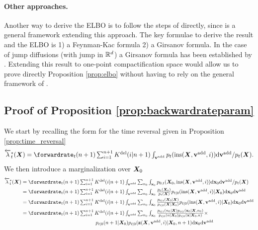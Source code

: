 \paragraph{Other approaches.} Another way to derive the ELBO is to follow
the steps of \cite{huang2021variational} directly, since
\cite{benton2022denoising} is a general framework extending this approach. The
key formulae to derive the result and the ELBO is 1) a Feynman-Kac formula 2) a
Girsanov formula.  In the case of jump diffusions (with jump in $\mathbb{R}^d$) a
Girsanov formula has been established by
\cite{cheridito2005equivalent}. Extending this result to one-point
compactification space would allow us to prove directly Proposition
\ref{prop:elbo} without having to rely on the general framework of
\cite{benton2022denoising}.

\subsection{Proof of Proposition \ref{prop:backwardrateparam}}
\label{sec:tddm-proofPropBackwardRateParam}
We start by recalling the form for the time reversal given in Proposition \ref{prop:time_reversal}
\begin{equation}
\textstyle    \backwardrate_{t}^*(\mX) = \forwardrate_{t}(n+1) \sum_{i=1}^{n+1} \delidxdist(i | n+1) \int_{\yadd} p_{t}( \textup{ins}(\mX, \yadd, i)) \rmd \yadd  / p_{t}(\mX) .
\end{equation}
We then introduce a marginalization over ${\bm{X}}_0$
\begin{align}
    \backwardrate_{t}^*(\mX) &\textstyle = \forwardrate_{t}(n+1)  \sum_{i=1}^{n+1} \delidxdist(i | n+1) \int_{\yadd} \sum_{n_0} \int_{\rvx_0} p_{0,t}(\mX_0, \textup{ins}(\mX, \yadd, i)) \rmd \rvx_0 \rmd \yadd  /p_{t}(\mX)\\
    &\textstyle = \forwardrate_{t}(n+1) \sum_{i=1}^{n+1} \delidxdist(i | n+1) \int_{\yadd} \sum_{n_0} \int_{\rvx_0} \frac{p_0(\mX_0)}{p_t(\mX)} p_{t|0}(\textup{ins}(\mX, \yadd, i) | \mX_0) \rmd \rvx_0 \rmd \yadd\\
    &\textstyle = \forwardrate_{t}(n+1) \sum_{i=1}^{n+1} \delidxdist(i | n+1) \int_{\yadd} \sum_{n_0} \int_{\rvx_0} \frac{p_{0|t}(\mX_0 | \mX)}{p_{t|0}(\mX | \mX_0)} p_{t|0}(\textup{ins}(\mX, \yadd, i) | \mX_0) \rmd \rvx_0 \rmd \yadd\\
    &\textstyle = \forwardrate_{t}(n+1) \sum_{i=1}^{n+1} \delidxdist(i | n+1) \int_{\yadd} \sum_{n_0} \int_{\rvx_0} \frac{p_{0|t}(n_0 | \mX) p_{0|t}(\rvx_0 | \mX, n_0)}{p_{t|0}(n | \mX_0) p_{t|0}(\rvx | \mX_0, n)} \times \\
    &\textstyle  \hspace{5cm} p_{t|0}(n+1 | \mX_0) p_{t|0}( \z(\mX, \yadd, i) | \mX_0, n+1) \rmd \rvx_0 \rmd \yadd
\end{align}
